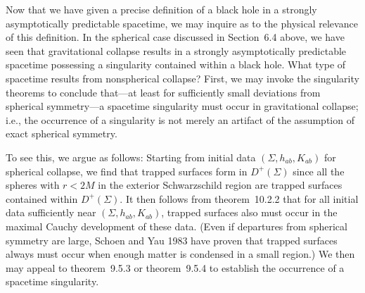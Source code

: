 Now that we have given a precise definition of a black hole in a strongly
asymptotically predictable spacetime, we may inquire as to the physical relevance of
this definition. In the spherical case discussed in Section~6.4 above, we have seen
that gravitational collapse results in a strongly asymptotically predictable spacetime
possessing a singularity contained within a black hole. What type of spacetime
results from nonspherical collapse? First, we may invoke the singularity theorems to
conclude that---at least for sufficiently small deviations from spherical
symmetry---a spacetime singularity must occur in gravitational collapse; i.e., the
occurrence of a singularity is not merely an artifact of the assumption of exact
spherical symmetry.

To see this, we argue as follows: Starting from initial data \((\Sigma,h_{ab},K_{ab})\)
for spherical collapse, we find that trapped surfaces form in \(D^+(\Sigma)\) since
all the spheres with \(r<2M\) in the exterior Schwarzschild region are trapped
surfaces contained within \(D^+(\Sigma)\). It then follows from theorem~10.2.2 that
for all initial data sufficiently near \((\Sigma,h_{ab},K_{ab})\), trapped surfaces
also must occur in the maximal Cauchy development of these data. (Even if
departures from spherical symmetry are large, Schoen and Yau 1983 have proven that
trapped surfaces always must occur when enough matter is condensed in a small
region.) We then may appeal to theorem~9.5.3 or theorem~9.5.4 to establish the
occurrence of a spacetime singularity.

